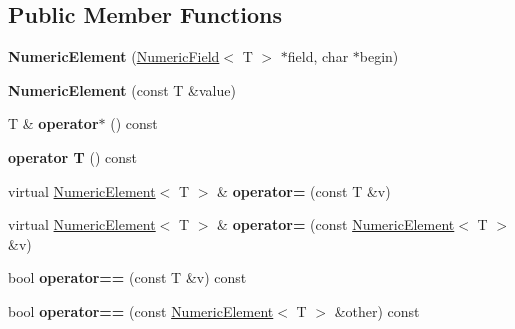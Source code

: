 \subsection*{Public Member Functions}
\begin{DoxyCompactItemize}
\item 
{\bfseries Numeric\+Element} (\hyperlink{classNumericField}{Numeric\+Field}$<$ T $>$ $\ast$field, char $\ast$begin)\hypertarget{classNumericElement_a1f791a554827c445bfdaac5c687f505e}{}\label{classNumericElement_a1f791a554827c445bfdaac5c687f505e}

\item 
{\bfseries Numeric\+Element} (const T \&value)\hypertarget{classNumericElement_a84cffceeff83dd2e6c7446c524c7427a}{}\label{classNumericElement_a84cffceeff83dd2e6c7446c524c7427a}

\item 
T \& {\bfseries operator$\ast$} () const \hypertarget{classNumericElement_a3a4de3b5027f2992c8e2984b52c8b46b}{}\label{classNumericElement_a3a4de3b5027f2992c8e2984b52c8b46b}

\item 
{\bfseries operator T} () const \hypertarget{classNumericElement_ad5cd11809018c872a68ecba21ee83248}{}\label{classNumericElement_ad5cd11809018c872a68ecba21ee83248}

\item 
virtual \hyperlink{classNumericElement}{Numeric\+Element}$<$ T $>$ \& {\bfseries operator=} (const T \&v)\hypertarget{classNumericElement_ad89e52aae78a5ab2f0c49a520db66bc9}{}\label{classNumericElement_ad89e52aae78a5ab2f0c49a520db66bc9}

\item 
virtual \hyperlink{classNumericElement}{Numeric\+Element}$<$ T $>$ \& {\bfseries operator=} (const \hyperlink{classNumericElement}{Numeric\+Element}$<$ T $>$ \&v)\hypertarget{classNumericElement_abb75aa68e7c4227a15d3eeeb62276fd2}{}\label{classNumericElement_abb75aa68e7c4227a15d3eeeb62276fd2}

\item 
bool {\bfseries operator==} (const T \&v) const \hypertarget{classNumericElement_a577263e095e47157ca3ac82c2b50dda0}{}\label{classNumericElement_a577263e095e47157ca3ac82c2b50dda0}

\item 
bool {\bfseries operator==} (const \hyperlink{classNumericElement}{Numeric\+Element}$<$ T $>$ \&other) const \hypertarget{classNumericElement_afb5166c9e9f26fcb2ffd4fdd4195f574}{}\label{classNumericElement_afb5166c9e9f26fcb2ffd4fdd4195f574}


\end{DoxyCompactItemize}
